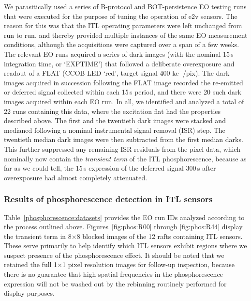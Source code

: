 We parasitically used a series of B-protocol and BOT-persistence EO testing runs that were executed for the purpose of tuning the operation of e2v sensors. The reason for this was that the ITL operating parameters were left unchanged from run to run, and thereby provided multiple instances of the same EO measurement conditions, although the acquisitions were captured over a span of a few weeks. The relevant EO runs acquired a series of dark images (with the nominal 15\,s integration time, or `EXPTIME') that followed a deliberate overexposure and readout of a FLAT (CCOB LED `red', target signal 400 ke$^-$/pix). The dark images acquired in succession following the FLAT image recorded the re-emitted or deferred signal collected within each 15\,s period, and there were 20 such dark images acquired within each EO run. In all, we identified and analyzed a total of 22 runs containing this data, where the excitation flat had the properties described above. The first and the twentieth dark images were stacked and medianed following a nominal instrumental signal removal (ISR) step. The twentieth median dark images were then subtracted from the first median darks. This further suppressed any remaining ISR residuals from the pixel data, which nominally now contain the {\it transient term} of the ITL phosphorescence, because as far as we could tell, the 15\,s expression of the deferred signal 300\,s after overexposure had almost completely attenuated.

\subsubsection{Results of phosphorescence detection in ITL sensors}\label{phos-results}

Table~\ref{phosphorescence:datasets} provides the EO run IDs analyzed according to the process outlined above. Figures~\ref{fig:phos:R00} through \ref{fig:phos:R44} display the transient term in 8$\times$8 blocked images of the 12 rafts containing ITL sensors. These serve primarily to help identify which ITL sensors exhibit regions where we suspect presence of the phosphorescence effect. It should be noted that we retained the full 
1$\times$1 
pixel resolution images for follow-up inspection, because there is no guarantee that high spatial frequencies in the phosphorescence expression will not be washed out by the rebinning routinely performed for display purposes.

